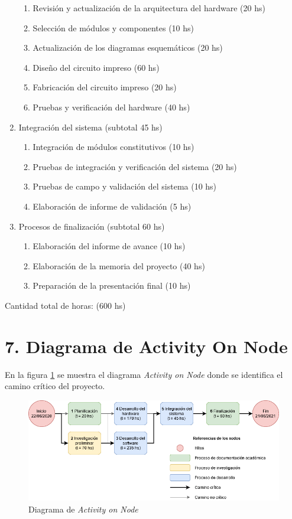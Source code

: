 \documentclass[11pt]{charter}
\begin{document}
\begin{enumerate}
  \begin{enumerate}
  \item Revisión y actualización de la arquitectura del hardware \hfill (20 hs)
  \item Selección de módulos y componentes \hfill (10 hs)
  \item Actualización de los diagramas esquemáticos \hfill (20 hs)
  \item Diseño del circuito impreso \hfill (60 hs)
  \item Fabricación del circuito impreso \hfill (20 hs)
  \item Pruebas y verificación del hardware \hfill (40 hs)
  \end{enumerate}
\item Integración del sistema \hfill (subtotal 45 hs)
  \begin{enumerate}
  \item Integración de módulos constitutivos \hfill (10 hs)
  \item Pruebas de integración y verificación del sistema \hfill (20 hs)
  \item Pruebas de campo y validación del sistema \hfill (10 hs)
  \item Elaboración de informe de validación \hfill (5 hs)
  \end{enumerate}
\item Procesos de finalización \hfill (subtotal 60 hs)
  \begin{enumerate}
  \item Elaboración del informe de avance \hfill (10 hs)
  \item Elaboración de la memoria del proyecto \hfill (40 hs)
  \item Preparación de la presentación final \hfill (10 hs)
  \end{enumerate}
\end{enumerate}

Cantidad total de horas: (600 hs)

\newpage

\section{7. Diagrama de Activity On Node}
\label{sec:AoN}

En la figura \ref{fig:AoN} se muestra el diagrama \textit{Activity on Node} donde se identifica el camino crítico del proyecto.

\begin{figure}[htpb]
\centering 
\includegraphics[width=1\textwidth]{./Figuras/activity_on_node.png}
\caption{Diagrama de \textit{Activity on Node}}
\label{fig:AoN}
\end{figure}
\end{document}
